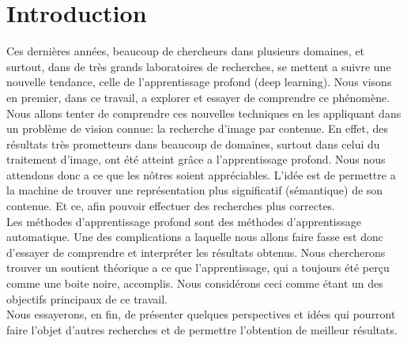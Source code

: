 
\chapter*{Introduction} %

Ces dernières années, beaucoup de chercheurs dans plusieurs domaines, et surtout, dans de très grands laboratoires de recherches, se mettent a suivre une nouvelle tendance, celle de l'apprentissage profond (deep learning). Nous visons en premier, dans ce travail, a explorer et essayer de comprendre ce phénomène.\\

Nous allons tenter de comprendre ces nouvelles techniques en les appliquant dans un problème de vision connue: la recherche d'image par contenue. En effet, des résultats très prometteurs dans beaucoup de domaines, surtout dans celui du traitement d'image, ont été atteint  grâce a l'apprentissage profond. Nous nous attendons donc a ce que les nôtres soient appréciables. L’idée est de permettre a la machine de trouver une représentation plus significatif (sémantique) de son contenue. Et ce, afin pouvoir effectuer des recherches plus correctes.\\

Les méthodes d’apprentissage profond sont des méthodes d'apprentissage automatique. Une des complications a laquelle nous allons faire fasse est donc d'essayer de comprendre et interpréter les résultats obtenus. Nous chercherons trouver un soutient théorique a ce que l'apprentissage, qui a toujours été perçu comme une boite noire, accomplis. Nous considérons ceci comme étant un des objectifs principaux de ce travail.\\

Nous essayerons, en fin, de présenter quelques perspectives et idées qui pourront faire l'objet d'autres recherches et de permettre l'obtention de meilleur résultats.

